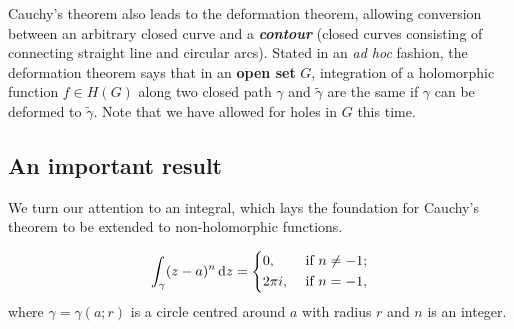 \documentclass{article}
\begin{document}
Cauchy's theorem also leads to the deformation theorem, allowing conversion between an arbitrary closed curve and a \textit{\textbf{contour}} (closed curves consisting of connecting straight line and circular arcs). Stated in an \textit{ad hoc} fashion, the deformation theorem says that in an \textbf{open set} $G$, integration of a holomorphic function $f \in H(G)$ along two closed path $\gamma$ and $\widetilde{\gamma}$ are the same if $\gamma $ can be deformed to $\widetilde{\gamma}.$ Note that we have allowed for holes in $G$ this time. 

\subsection{An important result}
We turn our attention to an integral, which lays the foundation for Cauchy's theorem to be extended to non-holomorphic functions. 
\begin{frm-res} \label{res:integration}
    \[ 
        \int_{\gamma } (z-a)^n  \,\mathrm{d}z = 
        \begin{dcases}
            0, &\text{ if } n \neq -1 ;\\
            2 \pi i, &\text{ if } n = -1 ,
        \end{dcases}
    \] 
    where $\gamma=\gamma (a;r)$ is a circle centred around $a$ with radius $r$ and $n$ is an integer. 
\end{frm-res}
\end{document}
